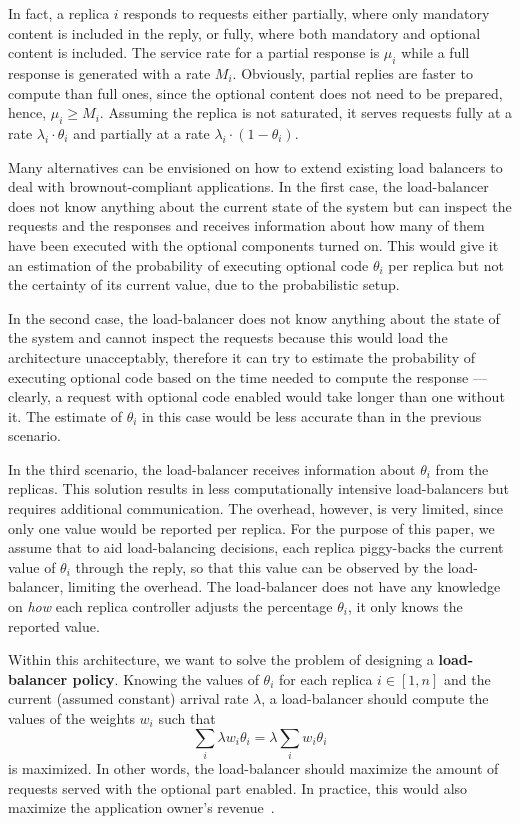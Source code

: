 In fact, a replica $i$ responds to requests either partially, where
only mandatory content is included in the reply, or fully, where both
mandatory and optional content is included. The service rate for a
partial response is $\mu_i$ while a full response is generated with a
rate $M_i$. Obviously, partial replies are faster to compute than full
ones, since the optional content does not need to be prepared, hence,
$\mu_i \geq M_i$. Assuming the replica is not saturated, it serves
requests fully at a rate $\lambda_i \cdot \theta_i$ and partially at a
rate $\lambda_i \cdot (1-\theta_i)$.

Many alternatives can be envisioned on how to extend existing load
balancers to deal with brownout-compliant applications.  In the first
case, the load-balancer does not know anything about the current state
of the system but can inspect the requests and the responses and
receives information about how many of them have been executed with
the optional components turned on. This would give it an estimation of
the probability of executing optional code $\theta_i$ per replica but
not the certainty of its current value, due to the probabilistic
setup.

In the second case, the load-balancer does not know anything about the
state of the system and cannot inspect the requests because this would
load the architecture unacceptably, therefore it can try to estimate
the probability of executing optional code based on the time needed to
compute the response --- clearly, a request with optional code enabled
would take longer than one without it. The estimate of $\theta_i$ in
this case would be less accurate than in the previous scenario.

In the third scenario, the load-balancer receives information about
$\theta_i$ from the replicas. This solution results in less
computationally intensive load-balancers but requires additional
communication. The overhead, however, is very limited, since only one
value would be reported per replica. For the purpose of this paper, we
assume that to aid load-balancing decisions, each replica piggy-backs
the current value of $\theta_i$ through the reply, so that this value
can be observed by the load-balancer, limiting the overhead. The
load-balancer does not have any knowledge on \emph{how} each replica
controller adjusts the percentage $\theta_i$, it only knows the
reported value.


Within this architecture, we want to solve the problem of designing a
{\bf load-balancer policy}. Knowing the values of $\theta_i$ for each
replica $i \in [1, n]$ and the current (assumed constant) arrival rate
$\lambda$, a load-balancer should compute the values of the weights
$w_i$ such that
\begin{equation}
\sum_{i} \lambda w_i \theta_i = \lambda \sum_i w_i \theta_i
\label{eq:objective}
\end{equation}
is maximized. In other words, the load-balancer should maximize the
amount of requests served with the optional part enabled. In practice,
this would also maximize the application owner's
revenue~\cite{cloudish-tr}.

